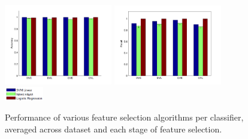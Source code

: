 \begin{figure}[tbp!]
\centering
\includegraphics[width=0.42\textwidth]{./figures/class_perf/Accuracy.pdf}
\includegraphics[width=0.42\textwidth]{./figures/class_perf/Recall.pdf}
\includegraphics[width=0.15\textwidth]{./figures/class_perf/legend.PNG}
\caption{\footnotesize Performance of various feature selection algorithms per classifier, averaged across dataset and each stage of feature selection.}
\label{fig:perf_vs_classifier}
\end{figure}

